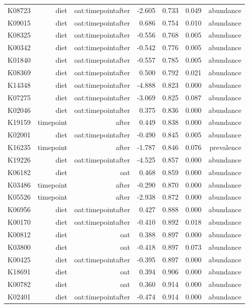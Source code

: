 \documentclass[
]{article}
\begin{document}
\begin{longtable}[t]{lrrrrrr}
K08723 & diet & oat:timepointafter & -2.605 & 0.733 & 0.049 & abundance\\
K09015 & diet & oat:timepointafter & 0.686 & 0.754 & 0.010 & abundance\\
K08325 & diet & oat:timepointafter & -0.556 & 0.768 & 0.005 & abundance\\
\addlinespace
K00342 & diet & oat:timepointafter & -0.542 & 0.776 & 0.005 & abundance\\
K01840 & diet & oat:timepointafter & -0.557 & 0.785 & 0.005 & abundance\\
K08369 & diet & oat:timepointafter & 0.500 & 0.792 & 0.021 & abundance\\
K14348 & diet & oat:timepointafter & -4.888 & 0.823 & 0.000 & abundance\\
K07275 & diet & oat:timepointafter & -3.069 & 0.825 & 0.087 & abundance\\
\addlinespace
K02046 & diet & oat:timepointafter & 0.375 & 0.836 & 0.000 & abundance\\
K19159 & timepoint & after & 0.449 & 0.838 & 0.000 & abundance\\
K02001 & diet & oat:timepointafter & -0.490 & 0.845 & 0.005 & abundance\\
K16235 & timepoint & after & -1.787 & 0.846 & 0.076 & prevalence\\
K19226 & diet & oat:timepointafter & -4.525 & 0.857 & 0.000 & abundance\\
\addlinespace
K06182 & diet & oat & 0.468 & 0.859 & 0.000 & abundance\\
K03486 & timepoint & after & -0.290 & 0.870 & 0.000 & abundance\\
K05526 & timepoint & after & -2.938 & 0.872 & 0.000 & abundance\\
K06956 & diet & oat:timepointafter & 0.427 & 0.888 & 0.000 & abundance\\
K00170 & diet & oat:timepointafter & -0.410 & 0.892 & 0.018 & abundance\\
\addlinespace
K00812 & diet & oat & 0.388 & 0.897 & 0.000 & abundance\\
K03800 & diet & oat & -0.418 & 0.897 & 0.073 & abundance\\
K00425 & diet & oat:timepointafter & -0.395 & 0.897 & 0.000 & abundance\\
K18691 & diet & oat & 0.394 & 0.906 & 0.000 & abundance\\
K00782 & diet & oat & 0.360 & 0.914 & 0.000 & abundance\\
\addlinespace
K02401 & diet & oat:timepointafter & -0.474 & 0.914 & 0.000 & abundance\\

\end{longtable}
\end{document}
